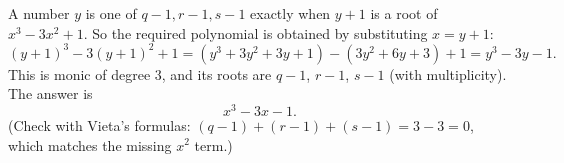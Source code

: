 A number $y$ is one of $q-1,r-1,s-1$ exactly when $y+1$ is a root of $x^3-3x^2+1$. So the required polynomial is obtained by substituting $x=y+1$:
\[(y+1)^3-3(y+1)^2+1=(y^3+3y^2+3y+1)-(3y^2+6y+3)+1=y^3-3y-1.\]
This is monic of degree $3$, and its roots are $q-1$, $r-1$, $s-1$ (with multiplicity). The answer is
\[\boxed{x^3-3x-1}.\]
(Check with Vieta's formulas: $(q-1)+(r-1)+(s-1)=3-3=0$, which matches the missing $x^2$ term.)
